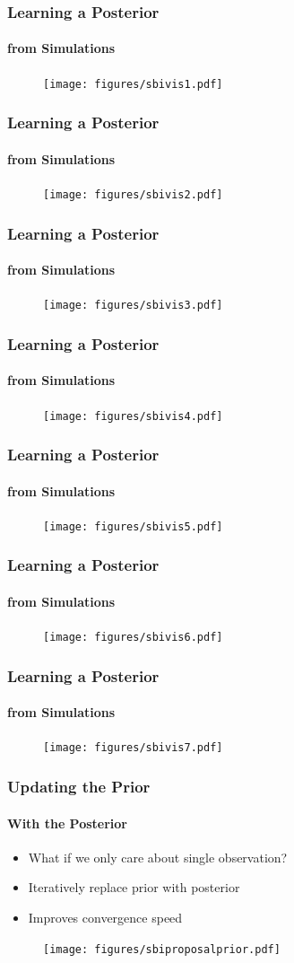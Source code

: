 \documentclass[9pt]{beamer}
\begin{document}
\begin{frame}
\frametitle{Learning a Posterior}
\framesubtitle{from Simulations}
\begin{figure}
	\texttt{[image: figures/sbivis1.pdf]}
\end{figure}
\end{frame} 
\begin{frame}
\frametitle{Learning a Posterior}
\framesubtitle{from Simulations}
\begin{figure}
	\texttt{[image: figures/sbivis2.pdf]}
\end{figure}
\end{frame} \begin{frame}
\frametitle{Learning a Posterior}
\framesubtitle{from Simulations}
\begin{figure}
\texttt{[image: figures/sbivis3.pdf]}
\end{figure}
\end{frame} \begin{frame}
\frametitle{Learning a Posterior}
\framesubtitle{from Simulations}
\begin{figure}
\texttt{[image: figures/sbivis4.pdf]}
\end{figure}
\end{frame} \begin{frame}
\frametitle{Learning a Posterior}
\framesubtitle{from Simulations}
\begin{figure}
\texttt{[image: figures/sbivis5.pdf]}
\end{figure}
\end{frame} \begin{frame}
\frametitle{Learning a Posterior}
\framesubtitle{from Simulations}
\begin{figure}
\texttt{[image: figures/sbivis6.pdf]}
\end{figure}
\end{frame}
\begin{frame}
\frametitle{Learning a Posterior}
\framesubtitle{from Simulations}
\begin{figure}
\texttt{[image: figures/sbivis7.pdf]}
\end{figure}
\end{frame}




\begin{frame}
\frametitle{Updating the Prior}
\framesubtitle{With the Posterior}
\begin{itemize}
	\item What if we only care about single observation?
	\item Iteratively replace prior with posterior
	\item Improves convergence speed
\end{itemize}
\begin{figure}
	\texttt{[image: figures/sbiproposalprior.pdf]}
\end{figure}
\end{frame} 
\end{document}
